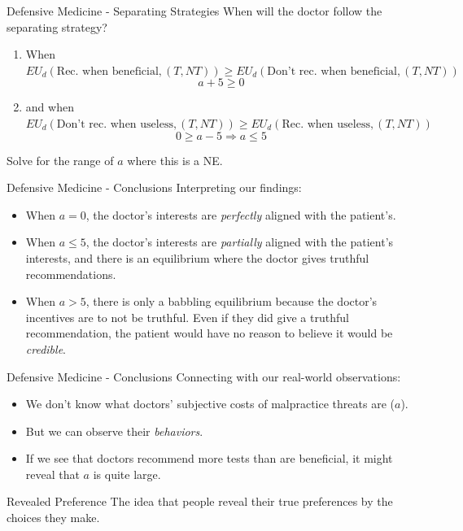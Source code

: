 

\begin{frame}{Defensive Medicine - Separating Strategies}
  When will the doctor follow the separating strategy?
  \begin{enumerate}
    \item When 
    $EU_d(\text{Rec. when beneficial}, (T,NT)) 
    \geq EU_d(\text{Don't rec. when beneficial}, (T,NT))$ 
    $$ a + 5 \geq 0 $$
    \item and when 
    $EU_d(\text{Don't rec. when useless}, (T,NT)) 
    \geq EU_d(\text{Rec. when useless}, (T,NT))$ 
    $$ 0 \geq a - 5 \Rightarrow a \leq 5 $$
  \end{enumerate}
  Solve for the range of $a$ where this is a NE.  
  $$  $$
\end{frame}

\begin{frame}{Defensive Medicine - Conclusions}
  Interpreting our findings:
  \begin{itemize}
    \item 
    When $a=0$, the doctor's interests are \textit{perfectly} aligned 
    with the patient's.
    \item 
    When $a\leq5$, the doctor's interests are \textit{partially} aligned 
    with the patient's interests,
    and there is an equilibrium where the doctor gives truthful recommendations.
    \item 
    When $a>5$, there is only a babbling equilibrium
    because the doctor's incentives are to not be truthful.
    Even if they did give a truthful recommendation,
    the patient would have no reason to believe it would be \textit{credible}.
  \end{itemize}
\end{frame}


\begin{frame}{Defensive Medicine - Conclusions}
  Connecting with our real-world observations:
  \begin{itemize}
    \item 
    We don't know what doctors' subjective costs of malpractice threats are
    ($a$).
    \item 
    But we can observe their \textit{behaviors}.
    \item 
    If we see that doctors recommend more tests than are beneficial,
    it might reveal that $a$ is quite large. 
  \end{itemize}
  \begin{block}{Revealed Preference}
    The idea that people reveal their true preferences by the choices they make.
  \end{block}
\end{frame}




